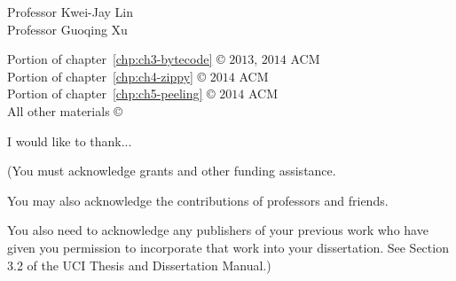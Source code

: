 



\othercommitteemembers
{
  Professor Kwei-Jay Lin\\
  Professor Guoqing Xu
}


\copyrightdeclaration
{
  Portion of chapter~\ref{chp:ch3-bytecode} {\copyright} $2013$, $2014$ ACM \\
  Portion of chapter~\ref{chp:ch4-zippy} {\copyright} $2014$ ACM \\
  Portion of chapter~\ref{chp:ch5-peeling} {\copyright} $2014$ ACM \\
  All other materials {\copyright} {\Degreeyear} \Authorname
}


%

\acknowledgments
{
  I would like to thank...

  (You must acknowledge grants and other funding assistance.

  You may also acknowledge the contributions of professors and
  friends.

  You also need to acknowledge any publishers of your previous
  work who have given you permission to incorporate that work
  into your dissertation. See Section 3.2 of the UCI Thesis and
  Dissertation Manual.)
}


